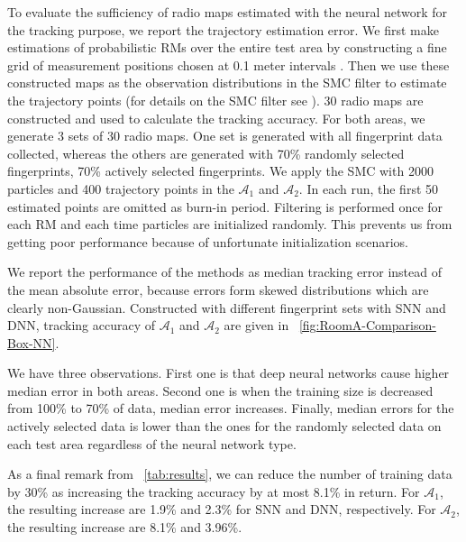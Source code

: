 \documentclass{article}
\begin{document}
	
	To evaluate the sufficiency of radio maps estimated with the neural network for the tracking purpose, we report the trajectory estimation error. We first make estimations of probabilistic RMs over the entire test area by constructing a fine grid of measurement positions chosen at 0.1 meter intervals \cite{Ser2017}. Then we use these constructed maps as the observation distributions in the SMC filter to estimate the trajectory points (for details on the SMC filter see \cite{Ser2017}). 30 radio maps are constructed and used to calculate the tracking accuracy. For both areas, we generate 3 sets of 30 radio maps. One set is generated with all fingerprint data collected, whereas the others are generated with 70\% randomly selected fingerprints, 70\% actively selected fingerprints. We apply the SMC with 2000 particles and 400 trajectory points in the $\mathcal{A}_1$ and $\mathcal{A}_2$. In each run, the first 50 estimated points are omitted as burn-in period.  Filtering is performed once for each RM and each time particles are initialized randomly. This prevents us from getting poor performance because of unfortunate initialization scenarios.
	
	We report the performance of the methods as median tracking error instead of the mean absolute error, because errors form skewed distributions which are clearly non-Gaussian. Constructed with different fingerprint sets with SNN and DNN, tracking accuracy of $\mathcal{A}_1$ and $\mathcal{A}_2$ are given in \figurename~\ref{fig:RoomA-Comparison-Box-NN}. 
	
	We have three observations. First one is that deep neural networks cause higher median error in both areas. Second one is when the training size is decreased from 100\% to 70\% of data, median error increases. Finally, median errors for the actively selected data is lower than the ones for the randomly selected data on each test area regardless of the neural network type. 
	
	As a final remark from \tablename~\ref{tab:results}, we can reduce the number of training data by 30\% as increasing the tracking accuracy by at most 8.1\% in return. For $\mathcal{A}_1$, the resulting increase are 1.9\% and 2.3\% for SNN and DNN, respectively. For $\mathcal{A}_2$, the resulting increase are 8.1\% and 3.96\%.
	
\end{document}
